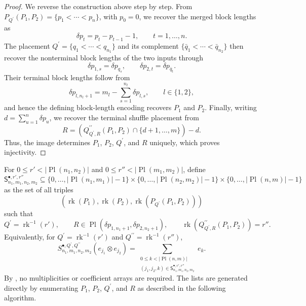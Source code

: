 \documentclass{amsart}
\theoremstyle{definition}
\theoremstyle{remark}
\begin{document}
\begin{proof}
We reverse the construction above step by step. From
$P_{Q^{\prime}}(P_1,P_2)=\{p_1<\cdots<p_n\}$, with $p_0=0$, we recover
the merged block lengths as
\[
    \delta p_t
    =
    p_t-p_{t-1}-1,
    \qquad
    t=1,\ldots,n.
\]
The placement $Q^{\prime}=\{q_1<\cdots<q_{n_1}\}$ and its complement
$\{\bar q_1<\cdots<\bar q_{n_2}\}$ then recover the nonterminal block
lengths of the two inputs through
\[
    \delta p_{1,s}
    =
    \delta p_{q_s},
    \qquad
    \delta p_{2,t}
    =
    \delta p_{\bar q_t}.
\]
Their terminal block lengths follow from
\[
    \delta p_{l,n_l+1}
    =
    m_l-\sum_{s=1}^{n_l}\delta p_{l,s},
    \qquad
    l\in\{1,2\},
\]
and hence the defining block-length encoding recovers $P_1$ and
$P_2$. Finally, writing
$d=\sum_{u=1}^{n}\delta p_u$, we recover the terminal shuffle placement
from
\[
    R
    =
    \left(
        Q^{\prime\prime}_{Q^{\prime},R}(P_1,P_2)
        \cap
        \{d+1,\ldots,m\}
    \right)
    -
    d.
\]
Thus, the image determines $P_1$, $P_2$, $Q^{\prime}$, and $R$ uniquely,
which proves injectivity.
\end{proof}

For
$0\leq r'<|\operatorname{Pl}(n_1,n_2)|$ and
$0\leq r''<|\operatorname{Pl}(m_1,m_2)|$, define
\[
    \mathsf{S}^{\bullet,r',r''}_{n_1,m_1,n_2,m_2}
    \subseteq
    \{0,\ldots,|\operatorname{Pl}(n_1,m_1)|-1\}
    \times
    \{0,\ldots,|\operatorname{Pl}(n_2,m_2)|-1\}
    \times
    \{0,\ldots,|\operatorname{Pl}(n,m)|-1\}
\]
as the set of all triples
\[
    \left(
        \operatorname{rk}(P_1),
        \operatorname{rk}(P_2),
        \operatorname{rk}
        \left(
            P_{Q^{\prime}}(P_1,P_2)
        \right)
    \right)
\]
such that
\[
    Q^{\prime}
    =
    \operatorname{rk}^{-1}(r'),
    \qquad
    R
    \in
    \operatorname{Pl}
    \left(
        \delta p_{1,n_1+1},
        \delta p_{2,n_2+1}
    \right),
    \qquad
    \operatorname{rk}
    \left(
        Q^{\prime\prime}_{Q^{\prime},R}(P_1,P_2)
    \right)
    =
    r''.
\]
Equivalently, for
$Q^{\prime}=\operatorname{rk}^{-1}(r')$ and
$Q^{\prime\prime}=\operatorname{rk}^{-1}(r'')$,
\[
    S^{\bullet,Q^{\prime},Q^{\prime\prime}}_{n_1,m_1,n_2,m_2}
    \left(
        e_{j_1}\otimes e_{j_2}
    \right)
    =
    \sum_{\substack{
        0\leq k<|\operatorname{Pl}(n,m)|\\
        (j_1,j_2,k)\in
        \mathsf{S}^{\bullet,r',r''}_{n_1,m_1,n_2,m_2}
    }}
    e_k.
\]
By , no multiplicities or coefficient
arrays are required. The lists are generated directly by enumerating
$P_1$, $P_2$, $Q^{\prime}$, and $R$ as described in the following
algorithm.
\end{document}
